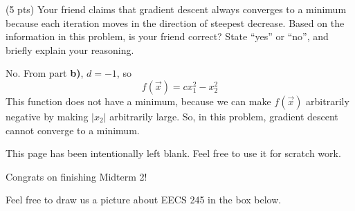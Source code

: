 \documentclass[11pt]{article}
\begin{document}
\begin{prob}[(15 pts)]
\begin{subprob}
\end{subprob}

\newpage

\begin{subprob}(5 pts)
Your friend claims that gradient descent always converges to a minimum because each iteration moves in the direction of steepest decrease. Based on the information in this problem, is your friend correct? State ``yes'' or ``no'', and briefly explain your reasoning. \\

\emptybox{8cm}

\begin{solution}
No. From part \textbf{b)}, $d=-1$, so
\[
f(\vec x) = cx_1^2 - x_2^2
\]
This function does not have a minimum, because we can make $f(\vec x)$ arbitrarily negative by making $|x_2|$ arbitrarily large. So, in this problem, gradient descent cannot converge to a minimum.
\end{solution}

\end{subprob}

\end{prob}

\newpage

\begin{center}

\:

\vspace{9cm}
This page has been intentionally left blank. Feel free to use it for scratch work.

\end{center}

\newpage

Congrats on finishing Midterm 2!

Feel free to draw us a picture about EECS 245 in the box below.

\emptybox{20cm}


\end{document}
